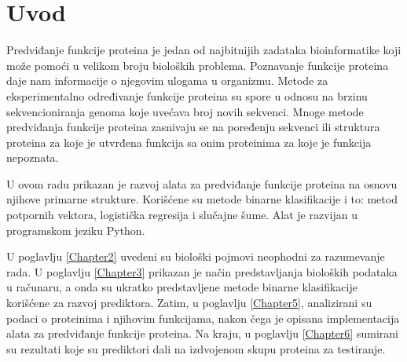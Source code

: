 \chapter{Uvod} %
\label{Chapter1}

Predviđanje funkcije proteina je jedan od najbitnijih zadataka bioinformatike koji može pomoći u velikom broju bioloških problema. Poznavanje funkcije proteina daje nam informacije o njegovim ulogama u organizmu. Metode za eksperimentalno određivanje funkcije proteina su spore u odnosu na brzinu sekvencioniranja genoma koje uvećava broj novih sekvenci. Mnoge metode predviđanja funkcije proteina zasnivaju se na poređenju sekvenci ili struktura proteina za koje je utvrđena funkcija sa onim proteinima za koje je funkcija nepoznata. 

U ovom radu prikazan je razvoj alata za predviđanje funkcije proteina na osnovu njihove primarne strukture. Korišćene su metode binarne klasifikacije i to: metod potpornih vektora, logistička regresija i slučajne šume. Alat je razvijan u programskom jeziku Python.

U poglavlju \ref{Chapter2} uvedeni su biološki pojmovi neophodni za razumevanje rada. U poglavlju \ref{Chapter3} prikazan je način predstavljanja bioloških podataka u računaru, a onda su ukratko predstavljene metode binarne klasifikacije korišćene za razvoj prediktora. Zatim, u poglavlju \ref{Chapter5}, analizirani su podaci o proteinima i njihovim funkcijama, nakon čega je opisana  implementacija alata za predviđanje funkcije proteina. Na kraju, u poglavlju \ref{Chapter6} sumirani su rezultati koje su prediktori dali na izdvojenom skupu proteina za testiranje.